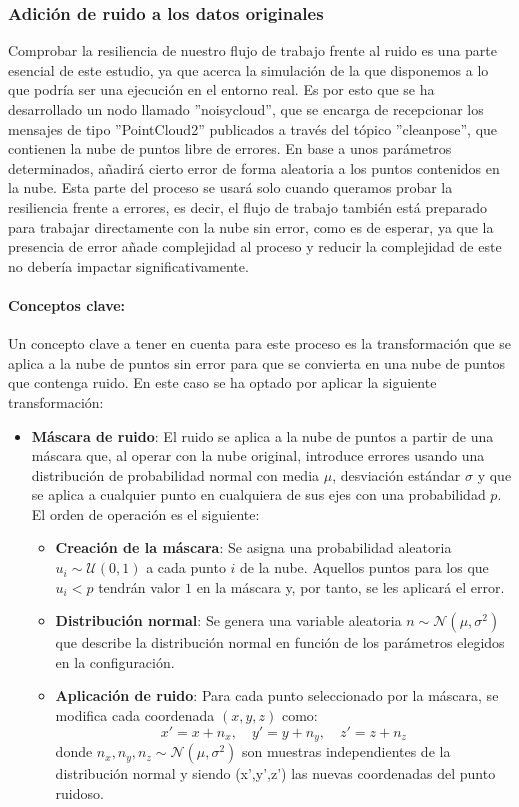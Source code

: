 \documentclass[12pt, a4paper, twoside]{article}
\begin{document}
\subsubsection{Adición de ruido a los datos originales}
Comprobar la resiliencia de nuestro flujo de trabajo frente al ruido es una parte esencial de este estudio, ya que acerca la simulación de la que disponemos 
a lo que podría ser una ejecución en el entorno real. Es por esto que se ha desarrollado un nodo llamado ''noisy\textunderscore cloud'', que se encarga de recepcionar 
los mensajes de tipo ''PointCloud2'' publicados a través del tópico ''clean\textunderscore pose'', que contienen la nube de puntos libre de errores. En base a unos 
parámetros determinados, añadirá cierto error de forma aleatoria a los puntos contenidos en la nube. Esta parte del proceso se usará solo cuando queramos probar la 
resiliencia frente a errores, es decir, el flujo de trabajo también está preparado para trabajar directamente con la nube sin error, como es de esperar, ya que la 
presencia de error añade complejidad al proceso y reducir la complejidad de este no debería impactar significativamente.

\paragraph{Conceptos clave:} 
Un concepto clave a tener en cuenta para este proceso es la transformación que se aplica a la nube de puntos sin error para que se convierta en una nube de 
puntos que contenga ruido. En este caso se ha optado por aplicar la siguiente transformación:
\begin{itemize}
  \item \textbf{Máscara de ruido}: El ruido se aplica a la nube de puntos a partir de una máscara que, al operar con la nube original, introduce errores 
  usando una distribución de probabilidad normal con media $\mu$, desviación estándar $\sigma$ y que se aplica a cualquier punto en cualquiera de sus ejes 
  con una probabilidad $p$. El orden de operación es el siguiente:
  \begin{itemize}
      \item \textbf{Creación de la máscara}: Se asigna una probabilidad aleatoria $u_i \sim \mathcal{U}(0,1)$ a cada punto $i$ de la nube.  
      Aquellos puntos para los que $u_i < p$ tendrán valor $1$ en la máscara y, por tanto, se les aplicará el error.
      
      \item \textbf{Distribución normal}: Se genera una variable aleatoria $n \sim \mathcal{N}(\mu, \sigma^2)$ que describe la distribución normal en 
      función de los parámetros elegidos en la configuración.
      
      \item \textbf{Aplicación de ruido}: Para cada punto seleccionado por la máscara, se modifica cada coordenada $(x, y, z)$ como:
      \[
      x' = x + n_x, \quad y' = y + n_y, \quad z' = z + n_z
      \]
      donde $n_x, n_y, n_z \sim \mathcal{N}(\mu, \sigma^2)$ son muestras independientes de la distribución normal y siendo (x',y',z') las nuevas coordenadas del punto ruidoso.
  \end{itemize}
\end{itemize}
\end{document}
